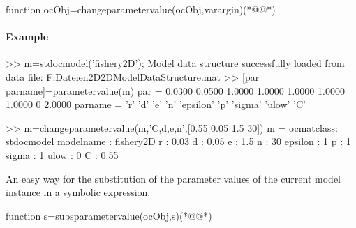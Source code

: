 \begin{matlab}
function ocObj=changeparametervalue(ocObj,varargin)(*@\label{cmd:changeparametervalue}@*)
%
%
% 
%
\end{matlab}
\paragraph{Example}
\begin{matlab}
>> m=stdocmodel('fishery2D');
Model data structure successfully loaded from data file:
F:\home\dieter\Eigene Dateien\Matlab\toolbox\numtools\ocmatnew\model\usermodel\fishery2D\data\fishery2DModelDataStructure.mat
>> [par parname]=parametervalue(m)
par =
    0.0300    0.0500    1.0000    1.0000    1.0000    1.0000    1.0000         0    2.0000
parname = 
    'r'    'd'    'e'    'n'    'epsilon'    'p'    'sigma'    'ulow'    'C'
		
>> m=changeparametervalue(m,'C,d,e,n',[0.55 0.05 1.5 30])
m =
ocmatclass: stdocmodel
    modelname : fishery2D
    r : 0.03
    d : 0.05
    e : 1.5
    n : 30
    epsilon : 1
    p : 1
    sigma : 1
    ulow : 0
    C : 0.55
\end{matlab}
An easy way for the substitution of the parameter values of the current model instance in a symbolic expression.
\begin{matlab}
function s=subsparametervalue(ocObj,s)(*@@*)
%
\end{matlab}
